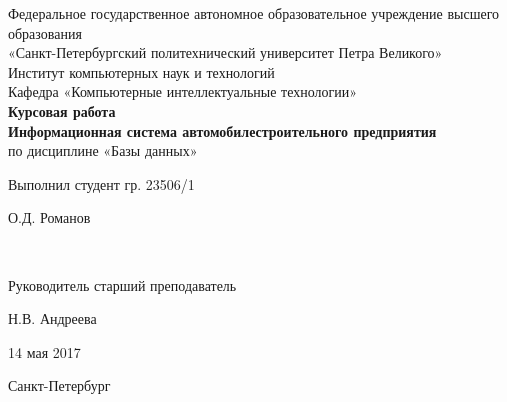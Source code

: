 \begin{titlepage}

	\begin{center}

		\large Федеральное государственное автономное образовательное учреждение высшего образования \\
		\large «Санкт-Петербургский политехнический университет Петра Великого» \\
		\large Институт компьютерных наук и технологий \\
		\large Кафедра «Компьютерные интеллектуальные технологии» \\[4cm]

		\huge {\bf Курсовая работа} \\[0.5cm]
		\large {\bf Информационная система автомобилестроительного предприятия} \\[0.1cm]
		\large по дисциплине «Базы данных» \\[4cm]

	\end{center}

    \begin{center}
        \begin{minipage}[t]{4cm}
            \begin{flushleft}
                Выполнил студент гр. 23506/1
            \end{flushleft}
        \end{minipage}
        \hfill
        \begin{minipage}[t]{4cm}
            \begin{flushright}
            О.Д. Романов
            \end{flushright}
        \end{minipage} \\[0.5cm]

        \begin{minipage}[t]{4cm}
            \begin{flushleft}
                Руководитель старший преподаватель
            \end{flushleft}
            \flushleft
        \end{minipage}
        \hfill
        \begin{minipage}[t]{4cm}
            \begin{flushright}
                Н.В. Андреева
            \end{flushright}
        \end{minipage}
    \end{center}

    \begin{flushright}
        14 мая 2017
    \end{flushright}

	
	\vfill

	\begin{center}
	    \large Санкт-Петербург\\
	    \large \the\year
	\end{center}
 
\end{titlepage}